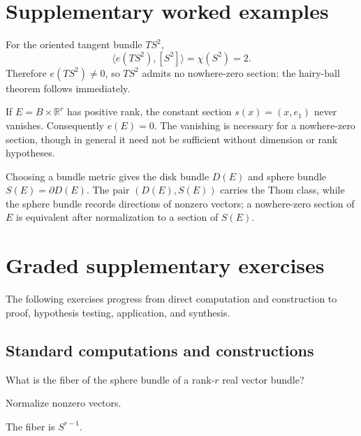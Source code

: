 \section{Supplementary worked examples}
\label{sec:viii32-pedagogy}

\begin{example}\label{ex:viii32-ped-01}
For the oriented tangent bundle $TS^2$,
\[
\langle e(TS^2),[S^2]\rangle=\chi(S^2)=2.
\]
Therefore $e(TS^2)\ne0$, so $TS^2$ admits no nowhere-zero section: the hairy-ball theorem follows immediately.
\end{example}

\begin{example}\label{ex:viii32-ped-02}
If $E=B\times\mathbb R^r$ has positive rank, the constant section $s(x)=(x,e_1)$ never vanishes. Consequently $e(E)=0$. The vanishing is necessary for a nowhere-zero section, though in general it need not be sufficient without dimension or rank hypotheses.
\end{example}

\begin{example}\label{ex:viii32-ped-03}
Choosing a bundle metric gives the disk bundle $D(E)$ and sphere bundle $S(E)=\partial D(E)$. The pair $(D(E),S(E))$ carries the Thom class, while the sphere bundle records directions of nonzero vectors; a nowhere-zero section of $E$ is equivalent after normalization to a section of $S(E)$.
\end{example}

\section{Graded supplementary exercises}
The following exercises progress from direct computation and construction to proof, hypothesis testing, application, and synthesis.

\subsection*{Standard computations and constructions}

\begin{exercise}\label{exr:viii32-ped-01}
What is the fiber of the sphere bundle of a rank-$r$ real vector bundle?
\end{exercise}
\begin{hint}
Normalize nonzero vectors.
\end{hint}
\begin{solution}
The fiber is $S^{r-1}$.
\end{solution}

